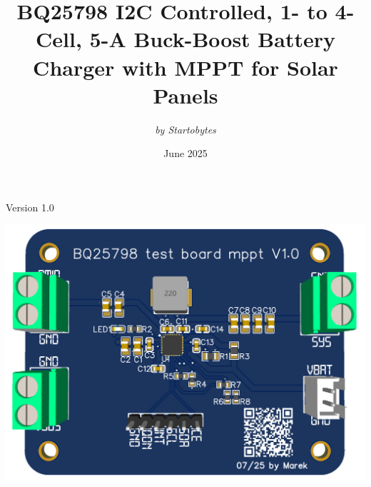 \documentclass[12pt]{article}
\title{BQ25798 I2C Controlled, 1- to 4-Cell, 5-A Buck-Boost Battery Charger with MPPT for Solar Panels}
\author{\textit{by Startobytes}}
\date{June 2025}
\newcommand{\versionnumber}{Version 1.0}
\begin{document}
\begin{titlepage}
    \centering
    \vspace*{2cm}

    {\Huge\bfseries \thetitle \par}
    
    \vspace{2cm}
    {\Large \theauthor \par}

    \vspace{1cm}
    {\large \thedate \par}
    
    \vspace{2cm}
    {\large \versionnumber \par}
    
    \vfill
    \includegraphics[width=0.9\linewidth]{BQ25798 test board mppt V1.0 3d render noBG.png}

\end{titlepage}

\pagestyle{fancy}
\fancyhead{}
\fancyfoot{}
\fancyfoot[C]{\theauthor}
\fancyfoot[R]{\thepage/\pageref*{LastPage}}  %
\newpage


\renewcommand{\contentsname}{Table of Content}
\tableofcontents
\thispagestyle{fancy}      %
\newpage
\end{document}
